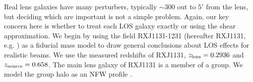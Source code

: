 Real lens galaxies have many perturbers, typically $\sim 300$ out to $5'$ from the lens, but deciding which are important is not a simple problem. Again, our key concern here is whether to treat each LOS galaxy exactly or using the shear approximation. We begin by using the field RXJ1131-1231 (hereafter RXJ1131, e.g. \citealt{Suyu13}) as a fiducial mass model to draw general conclusions about LOS effects for realistic beams. We use the measured redshifts of RXJ1131, $z_{\rm{lens}} = 0.2936$ and $z_{\rm{source}} = 0.658$.  The main lens galaxy of RXJ1131 is a member of a group. We model the group halo as an NFW profile \citep[][note that the group halo is also subject to our cuts on $\Delta_3 x$]{Navarro97}.
  
  
  
  